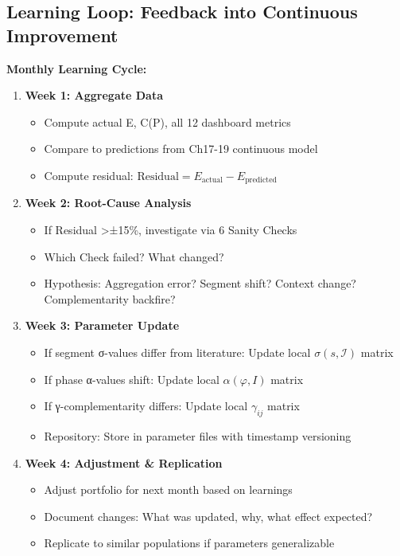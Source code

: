 \subsection{Learning Loop: Feedback into Continuous Improvement}

\textbf{Monthly Learning Cycle:}

\begin{enumerate}
\item \textbf{Week 1: Aggregate Data}
  \begin{itemize}[nosep]
  \item Compute actual E, C(P), all 12 dashboard metrics
  \item Compare to predictions from Ch17-19 continuous model
  \item Compute residual: $\text{Residual} = E_{\text{actual}} - E_{\text{predicted}}$
  \end{itemize}

\item \textbf{Week 2: Root-Cause Analysis}
  \begin{itemize}[nosep]
  \item If Residual >±15\%, investigate via 6 Sanity Checks
  \item Which Check failed? What changed?
  \item Hypothesis: Aggregation error? Segment shift? Context change? Complementarity backfire?
  \end{itemize}

\item \textbf{Week 3: Parameter Update}
  \begin{itemize}[nosep]
  \item If segment σ-values differ from literature: Update local $\sigma(s, \mathcal{I})$ matrix
  \item If phase α-values shift: Update local $\alpha(\varphi, I)$ matrix
  \item If γ-complementarity differs: Update local $\gamma_{ij}$ matrix
  \item Repository: Store in parameter files with timestamp versioning
  \end{itemize}

\item \textbf{Week 4: Adjustment & Replication}
  \begin{itemize}[nosep]
  \item Adjust portfolio for next month based on learnings
  \item Document changes: What was updated, why, what effect expected?
  \item Replicate to similar populations if parameters generalizable
  \end{itemize}

\end{enumerate}

